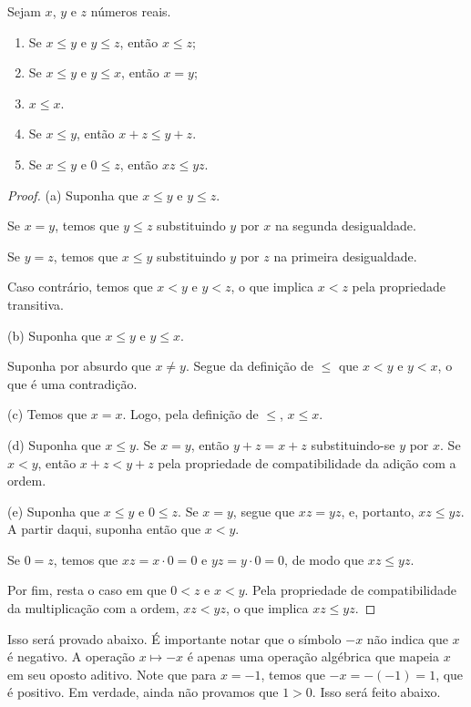 \begin{proposition}
    Sejam $x$, $y$ e $z$ números reais.
    \begin{enumerate}[label=(\alph*)]
        \item Se $x\leq y$ e $y\leq z$, então $x\leq z$;
        \item Se $x\leq y$ e $y\leq x$, então $x=y$;
        \item $x\leq x$.
        \item Se $x\leq y$, então $x+z \leq y+z$.
        \item Se $x\leq y$ e $0\leq z$, então $xz \leq yz$.
    \end{enumerate}
\end{proposition}
\begin{proof}\hfill
    (a) Suponha que $x\leq y$ e $y\leq z$.
    
    Se $x=y$, temos que $y\leq z$ substituindo $y$ por $x$ na segunda desigualdade.

    Se $y=z$, temos que $x\leq y$ substituindo $y$ por $z$ na primeira desigualdade.

    Caso contrário, temos que $x<y$ e $y<z$, o que implica $x<z$ pela propriedade transitiva.

    (b) Suponha que $x\leq y$ e $y\leq x$.

    Suponha por absurdo que $x\neq y$.
    Segue da definição de $\leq$ que $x<y$ e $y<x$, o que é uma contradição.

    (c) Temos que $x=x$.
    Logo, pela definição de $\leq$, $x\leq x$.

    (d) Suponha que $x\leq y$.
    Se $x=y$, então $y+z=x+z$ substituindo-se $y$ por $x$.
    Se $x<y$, então $x+z<y+z$ pela propriedade de compatibilidade da adição com a ordem.

    (e) Suponha que $x\leq y$ e $0\leq z$.
    Se $x=y$, segue que $xz=yz$, e, portanto, $xz\leq yz$.
    A partir daqui, suponha então que $x<y$.

    Se $0=z$, temos que $xz=x\cdot 0 = 0$ e $yz=y\cdot 0=0$, de modo que $xz\leq yz$.

    Por fim, resta o caso em que $0<z$ e $x<y$.
    Pela propriedade de compatibilidade da multiplicação com a ordem, $xz<yz$, o que implica $xz\leq yz$.
\end{proof}

Isso será provado abaixo.
É importante notar que o símbolo $-x$ não indica que $x$ é negativo.
A operação $x\mapsto -x$ é apenas uma operação algébrica que mapeia $x$ em seu oposto aditivo.
Note que para $x=-1$, temos que $-x=-(-1)=1$, que é positivo.
Em verdade, ainda não provamos que $1>0$.
Isso será feito abaixo.


